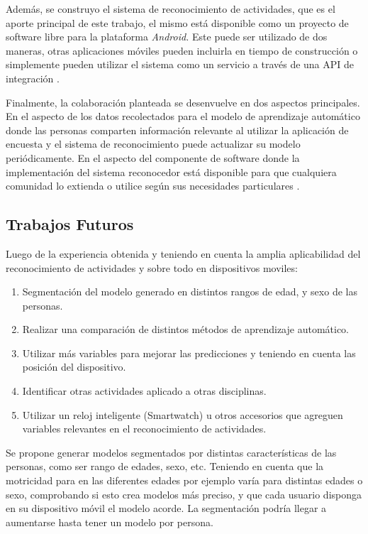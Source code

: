 Además, se construyo el sistema de reconocimiento de actividades,
que es el aporte principal de este trabajo, el mismo está disponible
como un proyecto de software libre para la plataforma \emph{Android.}
Este puede ser utilizado de dos maneras, otras aplicaciones móviles
pueden incluirla en tiempo de construcción o simplemente pueden utilizar
el sistema como un servicio a través de una API de integración \cite{hardroid2016a}.

Finalmente, la colaboración planteada se desenvuelve en dos aspectos
principales. En el aspecto de los datos recolectados para el modelo
de aprendizaje automático donde las personas comparten información
relevante al utilizar la aplicación de encuesta y el sistema de reconocimiento
puede actualizar su modelo periódicamente. En el aspecto del componente
de software donde la implementación del sistema reconocedor está disponible
para que cualquiera comunidad lo extienda o utilice según sus necesidades
particulares \cite{hardroid2016b}.

\subsection{Trabajos Futuros}
Luego de la experiencia obtenida y teniendo en cuenta la amplia aplicabilidad del reconocimiento de actividades y sobre todo en dispositivos moviles:
\begin{enumerate}
	\item Segmentación del modelo generado en distintos rangos de edad, y sexo de las personas.
	\item Realizar una comparación de distintos métodos de aprendizaje automático. 
	\item Utilizar más variables para mejorar las predicciones y teniendo en cuenta las posición del dispositivo.
	\item Identificar otras actividades aplicado a otras disciplinas.
	\item Utilizar un reloj inteligente (Smartwatch) u otros accesorios que agreguen variables relevantes en el reconocimiento de actividades.
\end{enumerate}

Se propone generar modelos segmentados por distintas características de las personas, como ser rango de edades, sexo, etc. Teniendo en cuenta que la motricidad para en las diferentes edades por ejemplo varía para distintas edades o sexo, comprobando si esto crea modelos más preciso, y que cada usuario disponga en su dispositivo móvil el modelo acorde. La segmentación podría llegar a aumentarse hasta tener un modelo por persona.

